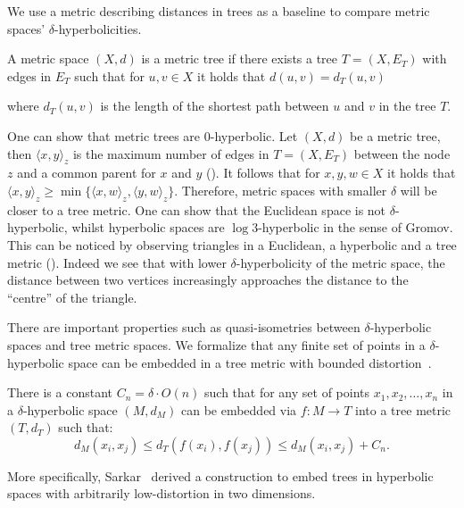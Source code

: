 We use a metric describing distances in trees as a baseline to compare metric spaces' $\delta$-hyperbolicities.

\begin{definition}
    A metric space $(X,d)$ is a metric tree if there exists a tree $T=(X,E_T)$ with edges in $E_T$ such that for $u,v\in X$ it holds that $d(u,v)=d_T(u,v)$
\end{definition}
where $d_T(u,v)$ is the length of the shortest path between $u$ and $v$ in the tree $T$. 
 


One can show that metric trees are $0$-hyperbolic. Let $(X,d)$ be a metric tree, then $\langle x, y\rangle_z$ is the maximum number of edges in $T=(X,E_T)$ between the node $z$ and a common parent for $x$ and $y$ (). It follows that for $x,y,w\in X$ it holds that $\langle x,y\rangle_z \geq \min\{\langle x,w\rangle_z, \langle y, w\rangle_z\}$. Therefore, metric spaces with smaller $\delta$ will be closer to a tree metric. One can show that the Euclidean space is not $\delta$-hyperbolic, whilst hyperbolic spaces are $\log 3$-hyperbolic in the sense of Gromov. This can be noticed by observing triangles in a Euclidean, a hyperbolic and a tree metric (). Indeed we see that with lower $\delta$-hyperbolicity of the metric space, the distance between two vertices increasingly approaches the distance to the ``centre'' of the triangle.

There are important properties such as quasi-isometries between $\delta$-hyperbolic spaces and tree metric spaces. We formalize that any finite set of points in a $\delta$-hyperbolic space can be embedded in a tree metric with bounded distortion~\cite{gromov1987hyperbolic}.

\begin{proposition}
    There is a constant $C_n =\delta \cdot O(n)$ such that for any set of points $x_1, x_2, \dots,x_n$ in a $\delta$-hyperbolic space $(M,d_M)$ can be embedded via $f:M \to T$ into a tree metric $(T,d_T)$ such that:
    \begin{equation*}
        d_M(x_i, x_j)\leq d_T(f(x_i), f(x_j)) \leq d_M(x_i, x_j) + C_n.
    \end{equation*}
\end{proposition}

More specifically, Sarkar~\cite{sarkar2011lowDIstortionDelaunayEmbedding} derived a construction to embed trees in hyperbolic spaces with arbitrarily low-distortion in two dimensions.

